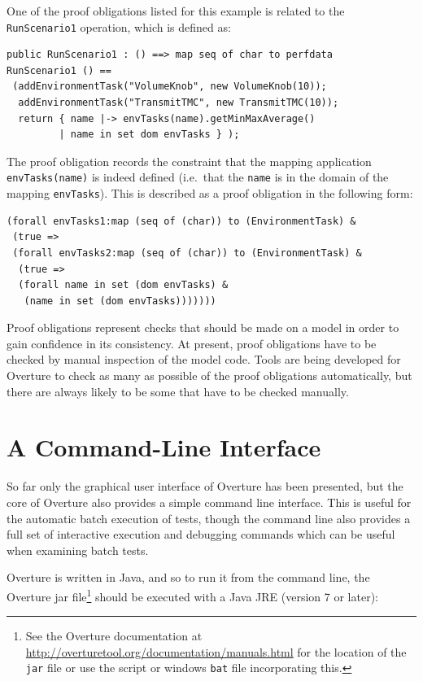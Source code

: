 One of the proof obligations listed for this example is related
to the \texttt{RunScenario1} operation, which is defined as:

\begin{lstlisting}
public RunScenario1 : () ==> map seq of char to perfdata
RunScenario1 () ==
 (addEnvironmentTask("VolumeKnob", new VolumeKnob(10));
  addEnvironmentTask("TransmitTMC", new TransmitTMC(10));
  return { name |-> envTasks(name).getMinMaxAverage() 
         | name in set dom envTasks } );
\end{lstlisting}

The proof obligation records the constraint that the mapping
application \texttt{envTasks(name)} is indeed defined (i.e.\ that the
\texttt{name} is in the domain of the mapping \texttt{envTasks}). This is described as a proof
obligation in the following form:

\begin{lstlisting}
(forall envTasks1:map (seq of (char)) to (EnvironmentTask) & 
 (true =>
 (forall envTasks2:map (seq of (char)) to (EnvironmentTask) &
  (true =>
  (forall name in set (dom envTasks) &
   (name in set (dom envTasks)))))))
\end{lstlisting}
Proof obligations represent checks that should be made on a model in
order to gain confidence in its consistency. At present, proof
obligations have to be checked by manual inspection of the model
code. Tools are being developed for Overture to check as many as
possible of the proof obligations automatically, but there are always
likely to be some that have to be checked manually. 


\section{A Command-Line Interface}\label{sec:cmdline}

So far only the graphical user interface of Overture has been
presented, but the core of Overture also
provides a simple command line interface.  This is useful for the
automatic batch execution of tests, though the command line also
provides a full set of interactive execution and debugging commands
which can be useful when examining batch tests. 

Overture is written in Java, and so to run it from the command line, the
Overture jar file\footnote{See the Overture documentation at
  \url{http://overturetool.org/documentation/manuals.html} for the location of the
  \texttt{jar} file or use the script or windows \texttt{bat} file incorporating this.}  
should be executed with a Java JRE (version 7 or later):

